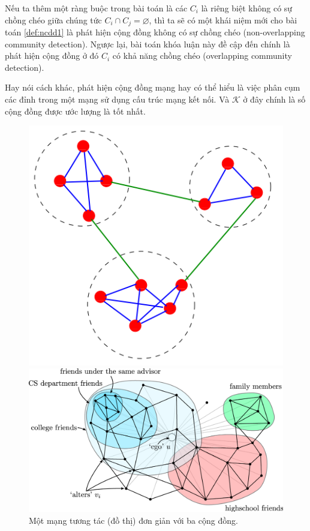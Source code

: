  Nếu ta thêm một ràng buộc trong bài toán là các $C_i$ là riêng biệt không có sự chồng chéo giữa chúng tức $C_i \cap C_j = \varnothing$, thì ta sẽ có một khái niệm mới cho bài toán \ref{def:ncdd1} là phát hiện cộng đồng không có sự chồng chéo (non-overlapping community detection). Ngược lại, bài toán khóa luận này đề cập đến chính là phát hiện cộng đồng ở đó $C_i$ có khả năng chồng chéo (overlapping community detection).
 
 Hay nói cách khác, phát hiện cộng đồng mạng hay có thể hiểu là việc phân cụm các đỉnh trong một mạng sử dụng cấu trúc mạng kết nối. Và $\mathcal{K}$ ở đây chính là số cộng đồng được ước lượng là tốt nhất.
 
 
\begin{figure}[h]
	\centering
	\begin{minipage}[b]{0.4\textwidth}
		\centering
		\includegraphics[width=1\linewidth]{Chapter1/Chapter1Figs/community-1}
		\caption{Một mạng tương tác (đồ thị) đơn giản với ba cộng đồng.}
		\label{fig:community1}
	\end{minipage}
	\begin{minipage}[b]{0.58\textwidth}
		\centering
		\includegraphics[width=1\linewidth]{Chapter1/Chapter1Figs/overlappingcommunity}

\end{minipage}
\end{figure}
